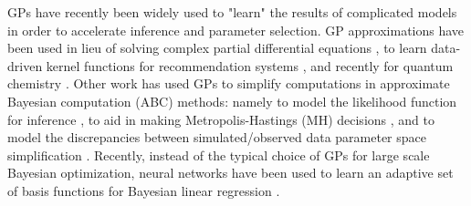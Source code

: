GPs have recently been widely used to "learn" the results of complicated models in order to accelerate inference and parameter selection. 
GP approximations have been used in lieu of solving complex partial differential equations \citep{SacksEtal1989, CurrinEtall1991}, to learn data-driven kernel functions for recommendation systems \citep{SchwaighoferEtAl2005}, and recently for quantum chemistry \citep{RuppEtAl2012}. 
%
Other work has used GPs to simplify computations in approximate Bayesian computation (ABC) methods: namely to model the likelihood function for inference \citep{Wilkinsons2014}, to aid in making Metropolis-Hastings (MH) decisions \citep{MeedsWelling2014}, and to model the discrepancies between simulated/observed data parameter space simplification \citep{GuttmanCorander2015}.
Recently, instead of the typical choice of GPs for large scale Bayesian optimization, neural networks have been used to learn an adaptive set of basis functions for Bayesian linear regression \citep{SnoekEtAl2015}.

